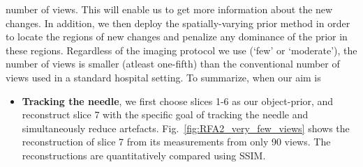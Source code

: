 \documentclass[journal]{IEEEtran}
\begin{document}
number of views. This will enable us to get more information about the
new changes. In addition, we then deploy the spatially-varying prior
method in order to locate the regions of new changes and penalize any
dominance of the prior in these regions.  Regardless of the imaging
protocol we use (`few' or `moderate'), the number of views is smaller
(atleast one-fifth) than the conventional number of views used in a
standard hospital setting. To summarize, when our aim is\\
\begin{itemize}
\item \textbf{Tracking the needle},  we first choose slices 1-6 as our
object-prior, and reconstruct slice 7 with the specific goal of
tracking the needle and simultaneously reduce
artefacts. Fig.~\ref{fig:RFA2_very_few_views} shows the reconstruction
of slice 7 from its measurements from only 90 views. The
reconstructions are quantitatively compared using SSIM.
\end{itemize}
\end{document}
